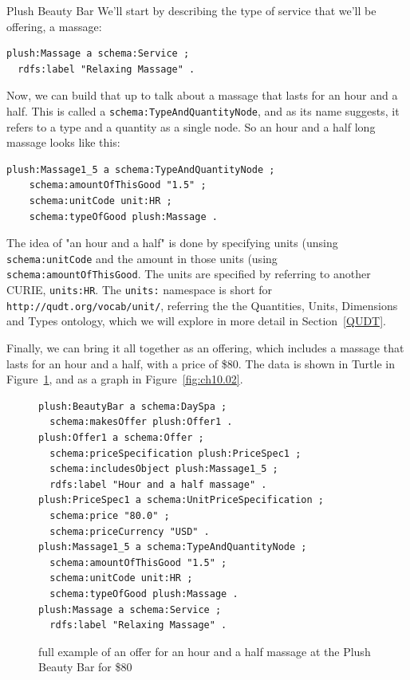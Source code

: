 \begin{example}{Plush Beauty Bar}
We'll start by describing the type of service that we'll be offering, a massage:


\begin{lstlisting}
plush:Massage a schema:Service ;
  rdfs:label "Relaxing Massage" .
\end{lstlisting}

Now, we can build that up to talk about a massage that lasts for an hour
and a half.  This is called a \texttt{schema:TypeAndQuantityNode}, and as its 
name suggests, it refers to a type and a quantity as a single node.  
So an hour and a half long  massage looks like this:

\begin{lstlisting}
plush:Massage1_5 a schema:TypeAndQuantityNode ;
    schema:amountOfThisGood "1.5" ;
    schema:unitCode unit:HR ;  
    schema:typeOfGood plush:Massage .
\end{lstlisting}

The idea of "an hour and a half" is done by specifying units (unsing \texttt{schema:unitCode} and the amount in those units (using \texttt{schema:amountOfThisGood}.  The units are specified by referring 
to another CURIE, \texttt{units:HR}.  The \texttt{units:} namespace
is short for \texttt{http://qudt.org/vocab/unit/}, referring the the Quantities, Units, Dimensions and Types ontology, which we will explore in more detail in 
Section~\ref{QUDT}. 

Finally, we can bring it all together as an offering, which includes a massage
that lasts for an hour and a half, with a price of \$80.  The data is shown in 
Turtle in Figure~\ref{fig:ch10.plushdata}, and as a graph in Figure~\ref{fig:ch10.02}.

\begin{figure}
\begin{lstlisting}
plush:BeautyBar a schema:DaySpa ;
  schema:makesOffer plush:Offer1 .
plush:Offer1 a schema:Offer ;
  schema:priceSpecification plush:PriceSpec1 ;
  schema:includesObject plush:Massage1_5 ;
  rdfs:label "Hour and a half massage" .
plush:PriceSpec1 a schema:UnitPriceSpecification ;
  schema:price "80.0" ;
  schema:priceCurrency "USD" .
plush:Massage1_5 a schema:TypeAndQuantityNode ;
  schema:amountOfThisGood "1.5" ;
  schema:unitCode unit:HR ;  
  schema:typeOfGood plush:Massage .
plush:Massage a schema:Service ;
  rdfs:label "Relaxing Massage" .
\end{lstlisting}
    \caption{full example of an offer for an hour and a half massage at the Plush Beauty Bar for \$80}
    \label{fig:ch10.plushdata}
\end{figure}


\end{example}
